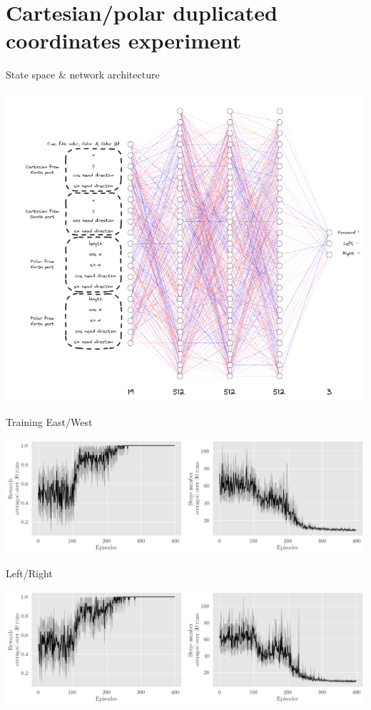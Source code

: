 \documentclass[bigger]{beamer}
\begin{document}
\section{Cartesian/polar duplicated coordinates experiment}
\label{sec:org1c6e01f}
\begin{frame}[label={sec:org7bb1314}]{State space \& network architecture}
\begin{center}
\includegraphics[height=0.95\textheight]{img/state-space-nn.png}
\end{center}
\end{frame}
\begin{frame}[label={sec:org93ab9d8}]{Training}
East/West
\begin{center}
\includegraphics[height=0.35\textheight]{img/steps-and-rewards-EastWest.png}
\end{center}
Left/Right
\begin{center}
\includegraphics[height=0.35\textheight]{img/steps-and-rewards-LeftRight.png}
\end{center}
\end{frame}
\end{document}
